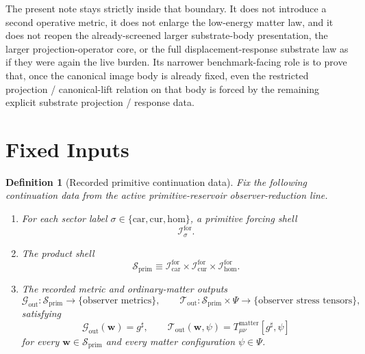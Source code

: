 \documentclass[11pt]{article}
\newcommand{\CompletedMetric}{g^{\sharp}}
\newcommand{\MatterSpace}{\Psi}
\newcommand{\Car}{\mathrm{car}}
\newcommand{\Cur}{\mathrm{cur}}
\newcommand{\Hom}{\mathrm{hom}}
\newcommand{\ForSpace}[1]{\mathcal I_{#1}^{\mathrm{for}}}
\newcommand{\PrimShell}{\mathcal S_{\mathrm{prim}}}
\newcommand{\MetricOut}{\mathscr G_{\mathrm{out}}}
\newcommand{\MatterOut}{\mathscr T_{\mathrm{out}}}
\newtheorem{definition}{Definition}
\begin{document}
The present note stays strictly inside that boundary. It does not introduce a second operative metric, it does not enlarge the low-energy matter law, and it does not reopen the already-screened larger substrate-body presentation, the larger projection-operator core, or the full displacement-response substrate law as if they were again the live burden. Its narrower benchmark-facing role is to prove that, once the canonical image body is already fixed, even the restricted projection / canonical-lift relation on that body is forced by the remaining explicit substrate projection / response data.

\section{Fixed Inputs}

\begin{definition}[Recorded primitive continuation data]
\label{def:fixed}
Fix the following continuation data from the active primitive-reservoir observer-reduction line.
\begin{enumerate}
    \item For each sector label \(\sigma\in\{\Car,\Cur,\Hom\}\), a primitive forcing shell
    \[
    \ForSpace{\sigma}.
    \]
    \item The product shell
    \[
    \PrimShell
    \equiv
    \ForSpace{\Car}\times \ForSpace{\Cur}\times \ForSpace{\Hom}.
    \]
    \item The recorded metric and ordinary-matter outputs
    \[
    \MetricOut:\PrimShell\to\{\text{observer metrics}\},
    \qquad
    \MatterOut:\PrimShell\times\MatterSpace\to\{\text{observer stress tensors}\},
    \]
    satisfying
    \begin{equation}
    \MetricOut(\mathbf w)=\CompletedMetric,
    \qquad
    \MatterOut(\mathbf w,\psi)
    =
    T_{\mu\nu}^{\mathrm{matter}}[\CompletedMetric,\psi]
    \label{eq:fixedoutputs}
    \end{equation}
    for every \(\mathbf w\in\PrimShell\) and every matter configuration \(\psi\in\MatterSpace\).
\end{enumerate}
\end{definition}
\end{document}
